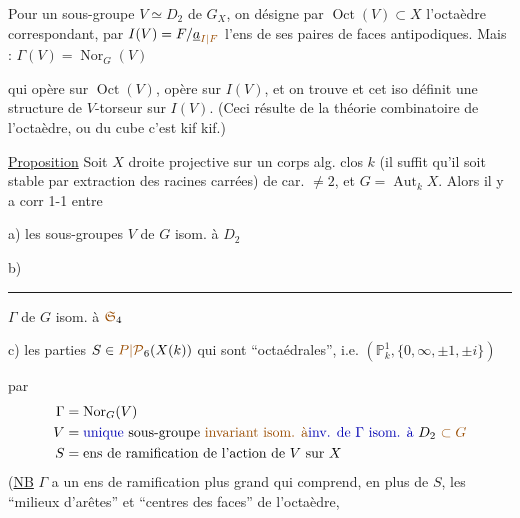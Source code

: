 Pour un sous-groupe $V\simeq D_2$ de $G_X$, on désigne
par $\operatorname{Oct}(V)\subset X$ l'octaèdre correspondant, par $I(V)=F/\uline{a}_{\unsure{I|F}}$
l'ens de ses paires de faces antipodiques. Mais : $\Gamma(V)=\operatorname{Nor}_G(V)$

qui opère sur $\operatorname{Oct}(V)$, opère sur $I(V)$, et on trouve
et cet iso  définit une structure de
$V$-torseur sur $I(V)$. (Ceci résulte de la théorie
combinatoire de l'octaèdre, ou du cube c'est kif kif.)

\uline{Proposition} Soit $X$ droite projective  sur un corps alg. clos $k$
(il suffit qu'il  soit stable par extraction des racines
carrées) de car. $\ne2$, et $G=\operatorname{Aut}_kX$. Alors il y a corr 1-1
entre

a) les sous-groupes $V$ de $G$ isom. à $D_2$

b) \rule{3cm}{0.2pt} $\Gamma$ de $G$ isom. à $\unsure{\mathfrak S}_4$ 

c) les parties $S\in\unsure{P|\mathcal P}_6(X(k))$ qui sont ``octaédrales'', i.e.
 $(\mathbb P^1_k,\{0,\infty,\pm1,\pm i\})$

par
\[
\begin{aligned}
\Gamma&=\operatorname{Nor}_G(V)\\
V&=\inserted{\text{unique}}\ \text{sous-groupe }\deleted{\text{\unsure{invariant isom. à}}}\inserted{\text{inv. de }\Gamma\ \text{isom. à}}\ D_2\ \deleted{\unsure{\subset G}}\\
S&=\text{ens de ramification de l'action de }V\text{ sur }X
\end{aligned}
\]
(\uline{NB} $\Gamma$ a un ens de ramification
plus grand qui comprend, en plus de $S$,
les ``milieux d'arêtes'' et ``centres des faces''
de l'octaèdre,



